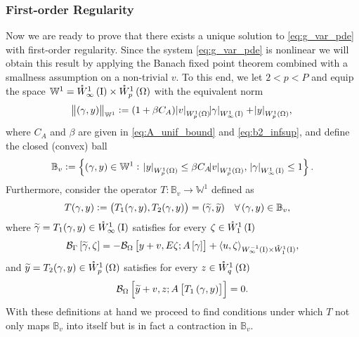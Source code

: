 \documentclass[final]{siamltex}
\begin{document}
\subsubsection{First-order Regularity}
Now we are ready to prove that there exists a unique solution to \eqref{eq:g_var_pde} with first-order regularity. 
Since the system \eqref{eq:g_var_pde} is nonlinear we will obtain this result by applying the Banach fixed point theorem 
combined with a smallness assumption on a non-trivial $v$. To this end, we let $2 < p < P$ and equip the space 
${\mathbb{W}}^1 = {{\mathring{W}^{1}_{\infty}\del{{\text{\rm I}}}}} \times{{\mathring{W}^{1}_{p}\del{\Omega}}}$ with the equivalent norm
\begin{align}  \label{eq:W1_equiv_norm}
 \norm{\del{\gamma,y}}_{{\mathbb{W}}^1} :=\del{1+\beta C_A}{\abs{{v}}_{{W^{{1}}_{{p}}\del{{\Omega}}}}} {\abs{{\gamma}}_{{W^{{{1}}}_{{{\infty}}}\del{{\text{\rm I}}}}}} +
		{\abs{{y}}_{{W^{{{1}}}_{{{p}}}\del{{{\Omega}}}}}},
\end{align}		
where $C_A$ and $\beta$ are given in  \eqref{eq:A_unif_bound} and \eqref{eq:b2_infsup}, 
and define the closed (convex) ball 
\begin{align}    \label{eq:W1_convex_set}
    {\mathbb{B}}_v  := \set{(\gamma,y) \in {\mathbb{W}}^1 :\;
		{\abs{{y}}_{{W^{{{1}}}_{{{p}}}\del{{{\Omega}}}}}} \leq \beta C_A {\abs{v}_{{W^{{1}}_{{p}}\del{{\Omega}}}}},\; {\abs{{\gamma}}_{{W^{{1}}_{{\infty}}\del{{\text{\rm I}}}}}} \leq 1}.
\end{align}		
Furthermore, consider the operator $T:{\mathbb{B}}_v \rightarrow {\mathbb{W}}^1$ defined as
	\begin{align} \label{eq:T_oper}
		T(\gamma, y) &:=  \del{T_1(\gamma, y), T_2(\gamma, y)} = \del{{\widetilde{\gamma}}, {\widetilde{y}}} && \forall \del{\gamma,y} \in {\mathbb{B}}_v,
	\end{align}
where ${\widetilde{\gamma}} = T_1(\gamma, y) \in {{\mathring{W}^{1}_{\infty}\del{{\text{\rm I}}}}}$ satisfies for every  $\zeta \in {{\mathring{W}^{{1}}_{{1}}\del{{\text{\rm I}}}}}$
	\begin{equation}\label{eq:t1_var}
		{{\mathcal{B}}_\Gamma}\sbr{{\widetilde{\gamma}},\zeta} = -{{\mathcal{B}}_\Omega}\sbr{y + v,E\zeta;A\sbr{\gamma}} + {{\mathop{{\left\langle {{u,\zeta}} \right\rangle}}}_{{{W^{{-{1}}}_{{{\infty}}}\del{{{\text{\rm I}}}}}}\times{{\mathring{W}^{{{1}}}_{{{1}}}\del{{{\text{\rm I}}}}}}}},
	\end{equation}
and ${\widetilde{y}} = T_2(\gamma,y) \in {{\mathring{W}^{1}_{p}\del{\Omega}}}$ satisfies for every $z \in {{\mathring{W}^{{1}}_{{q}}\del{{\Omega}}}}$
	\begin{equation}\label{eq:t2_var}
		{{\mathcal{B}}_\Omega}\sbr{{\widetilde{y}} + v,z;A\sbr{T_1\del{\gamma,y}}} = 0 .
	\end{equation}
With these definitions at hand we proceed to find conditions under which $T$ not only maps ${\mathbb{B}}_v$ into itself but is in fact a contraction in ${\mathbb{B}}_v$.
\end{document}
